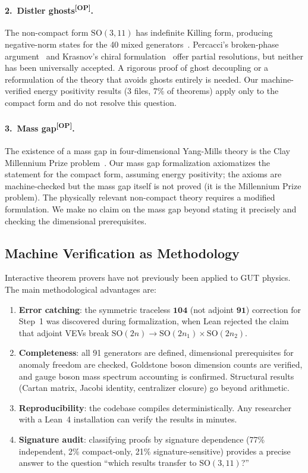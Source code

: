 \documentclass[aps,prd,twocolumn,showpacs,preprintnumbers,superscriptaddress,floatfix]{revtex4-2}
\newcommand{\OP}{\textsuperscript{[OP]}}
\begin{document}
\paragraph{2.\ Distler ghosts\OP.}
The non-compact form $\mathrm{SO}(3,11)$ has indefinite Killing form,
producing negative-norm states for the 40 mixed
generators~\cite{distler2010}.  Percacci's broken-phase
argument~\cite{nesti2010} and Krasnov's chiral
formulation~\cite{krasnov2018} offer partial resolutions, but neither
has been universally accepted.  A rigorous proof of ghost decoupling
or a reformulation of the theory that avoids ghosts entirely is needed.
Our machine-verified energy positivity results (3 files, 7\% of theorems)
apply only to the compact form and do not resolve this question.

\paragraph{3.\ Mass gap\OP.}
The existence of a mass gap in four-dimensional Yang-Mills theory
is the Clay Millennium Prize problem~\cite{jaffe2006}.  Our
mass gap formalization axiomatizes the statement for the compact form,
assuming energy positivity; the axioms are machine-checked but the mass gap itself is not proved (it is the Millennium Prize problem).  The physically relevant non-compact
theory requires a modified formulation.  We make no claim
on the mass gap beyond stating it precisely and checking the
dimensional prerequisites.

\subsection{Machine Verification as Methodology}

Interactive theorem provers have not previously been applied to GUT physics.
The main methodological advantages are:

\begin{enumerate}
\item \textbf{Error catching}: the symmetric traceless $\mathbf{104}$
  (not adjoint $\mathbf{91}$) correction for Step~1 was discovered
  during formalization, when Lean rejected the claim that adjoint
  VEVs break $\mathrm{SO}(2n) \to \mathrm{SO}(2n_1) \times
  \mathrm{SO}(2n_2)$.
\item \textbf{Completeness}: all 91 generators are defined, dimensional prerequisites for anomaly freedom are checked, Goldstone boson dimension counts are verified, and gauge boson mass spectrum accounting is confirmed.  Structural results (Cartan matrix, Jacobi identity, centralizer closure) go beyond arithmetic.
\item \textbf{Reproducibility}: the codebase compiles deterministically.
  Any researcher with a Lean~4 installation can verify the results
  in minutes.
\item \textbf{Signature audit}: classifying proofs by signature
  dependence (77\% independent, 2\% compact-only, 21\% signature-sensitive)
  provides a precise answer to the question ``which results transfer
  to $\mathrm{SO}(3,11)$?''
\end{enumerate}
\end{document}
